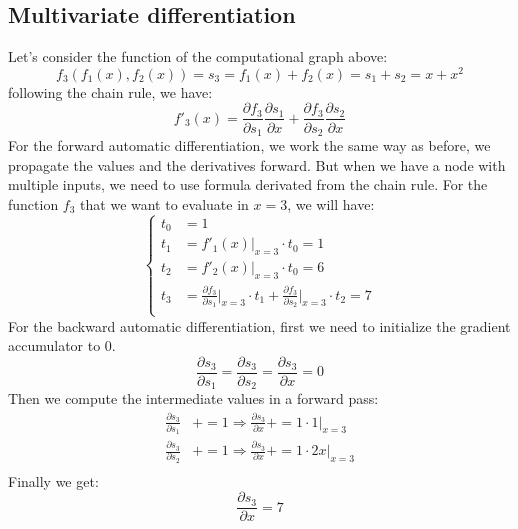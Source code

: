 \documentclass[12pt, openany]{report}
\theoremstyle{definition}
\begin{document}
\subsection{Multivariate differentiation}
Let's consider the function of the computational graph above:
\begin{equation}
  f_3(f_1(x),f_2(x)) = s_3 = f_1(x) + f_2(x) = s_1 + s_2 = x + x^2 
\end{equation}
following the chain rule, we have:
\begin{equation}
  f'_3(x) = \frac{\partial f_3}{\partial s_1} \frac{\partial s_1}{\partial x} + \frac{\partial f_3}{\partial s_2} \frac{\partial s_2}{\partial x}
\end{equation}
For the forward automatic differentiation, we work the same way as before, we propagate the values and the derivatives forward. But when we have a node with multiple inputs, we need to use formula derivated from the chain rule. For the function $f_3$ that we want to evaluate in $x=3$, we will have:
\begin{equation}
	\begin{cases}
		t_0 &= 1 \\
		t_1 &= f'_1(x) \vert_{x=3} \cdot t_0 = 1\\
		t_2 &= f'_2(x) \vert_{x=3} \cdot t_0 = 6\\
		t_3 &= \frac{\partial f_3}{\partial s_1} \vert_{x=3} \cdot t_1 + \frac{\partial f_3}{\partial s_2} \vert_{x=3} \cdot t_2 = 7\\
	\end{cases}
\end{equation}
For the backward automatic differentiation, first we need to initialize the gradient accumulator to 0.
\begin{equation}
	\frac{\partial s_3}{\partial s_1} = \frac{\partial s_3}{\partial s_2} = \frac{\partial s_3}{\partial x} = 0
\end{equation}
Then we compute the intermediate values in a forward pass:
\begin{equation}
	\begin{aligned}
		\frac{\partial s_3}{\partial s_1} &+= 1 \Rightarrow \frac{\partial s_3}{\partial x} += 1 \cdot 1 \vert_{x=3}\\		
		\frac{\partial s_3}{\partial s_2} &+= 1 \Rightarrow \frac{\partial s_3}{\partial x} += 1 \cdot 2x \vert_{x=3}\\
	\end{aligned}
\end{equation}
Finally we get:
\begin{equation}
	\frac{\partial s_3}{\partial x} = 7
\end{equation}
\end{document}
